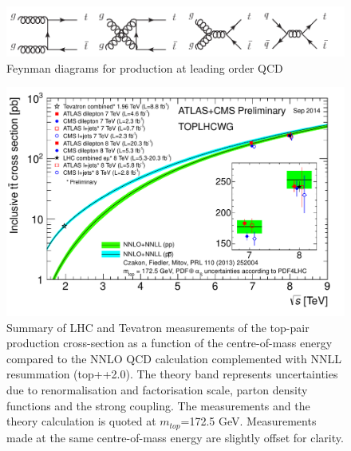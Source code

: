 \begin{figure}
\includegraphics[width=\textwidth]{fig/thry/fig_ttbar.png}
\caption{Feynman diagrams for \ttbar production at leading order QCD}
\label{fig:ttdiag}
\end{figure}

\begin{figure}
\includegraphics[width=\textwidth]{fig/thry/tt_xsec_vsroots.pdf}
\caption{Summary of LHC and Tevatron measurements of the top-pair production cross-section as a function of the centre-of-mass energy compared to the NNLO QCD calculation complemented with NNLL resummation (top++2.0). The theory band represents uncertainties due to renormalisation and factorisation scale, parton density functions and the strong coupling. The measurements and the theory calculation is quoted at $m_{top}$=172.5 GeV. Measurements made at the same centre-of-mass energy are slightly offset for clarity.}
\label{fig:ttxsec}
\end{figure}

